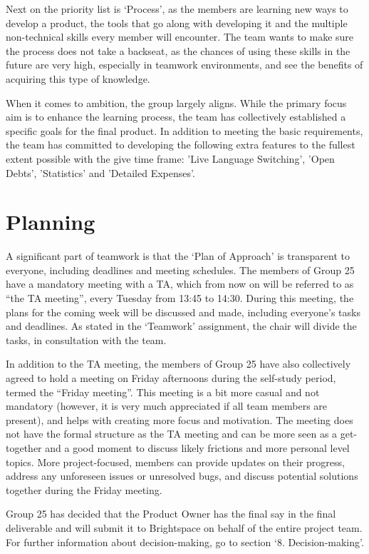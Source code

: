 \documentclass[sigconf,nonacm]{acmart}
\begin{document}
Next on the priority list is ‘Process’, as the members are learning new ways to develop a product, the tools that go along with developing it and the multiple non-technical skills every member will encounter. The team wants to make sure the process does not take a backseat, as the chances of using these skills in the future are very high, especially in teamwork environments, and see the benefits of acquiring this type of knowledge.

When it comes to ambition, the group largely aligns. While the primary focus aim is to enhance the learning process, the team has collectively established a specific goals for the final product. In addition to meeting the basic requirements, the team has committed to developing the following extra features to the fullest extent possible with the give time frame: 'Live Language Switching', 'Open Debts', 'Statistics' and 'Detailed Expenses'.


\section{Planning}
A significant part of teamwork is that the ‘Plan of Approach’ is transparent to everyone, including deadlines and meeting schedules. The members of Group 25 have a mandatory meeting with a TA, which from now on will be referred to as “the TA meeting”, every Tuesday from 13:45 to 14:30. During this meeting, the plans for the coming week will be discussed and made, including everyone’s tasks and deadlines. As stated in the ‘Teamwork’ assignment, the chair will divide the tasks, in consultation with the team.

In addition to the TA meeting, the members of Group 25 have also collectively agreed to hold a meeting on Friday afternoons during the self-study period, termed the “Friday meeting”. This meeting is a bit more casual and not mandatory (however, it is very much appreciated if all team members are present), and helps with creating more focus and motivation. The meeting does not have the formal structure as the TA meeting and can be more seen as a get-together and a good moment to discuss likely frictions and more personal level topics. More project-focused, members can provide updates on their progress, address any unforeseen issues or unresolved bugs, and discuss potential solutions together during the Friday meeting.

Group 25 has decided that the Product Owner has the final say in the final deliverable and will submit it to Brightspace on behalf of the entire project team. For further information about decision-making, go to section ‘8. Decision-making’.
\end{document}

